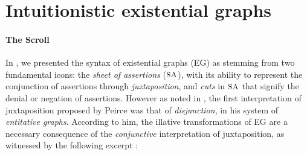 






\section{Intuitionistic existential graphs}

\paragraph{The Scroll}

In , we presented the syntax of existential graphs (EG) as
stemming from two fundamental icons: the \emph{sheet of assertions} ($\small\textsc{SA}$),
with its ability to represent the conjunction of assertions through
\emph{juxtaposition}, and \emph{cuts} in $\small\textsc{SA}$ that signify the denial or
negation of assertions. However as noted in , the first
interpretation of juxtaposition proposed by Peirce was that of
\emph{disjunction}, in his system of \emph{entitative graphs}. According to him,
the illative transformations of EG are a necessary consequence of the
\emph{conjunctive} interpretation of juxtaposition, as witnessed by the
following excerpt :

